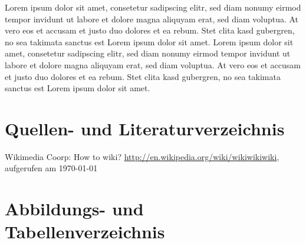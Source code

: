 \documentclass[11pt,a4paper,titlepage,ngerman]{article}
\begin{document}
Lorem ipsum dolor sit amet, consetetur sadipscing elitr, sed diam nonumy eirmod tempor invidunt ut labore et dolore magna aliquyam erat, sed diam voluptua. At vero eos et accusam et justo duo dolores et ea rebum. Stet clita kasd gubergren, no sea takimata sanctus est Lorem ipsum dolor sit amet. Lorem ipsum dolor sit amet, consetetur sadipscing elitr, sed diam nonumy eirmod tempor invidunt ut labore et dolore magna aliquyam erat, sed diam voluptua. At vero eos et accusam et justo duo dolores et ea rebum. Stet clita kasd gubergren, no sea takimata sanctus est Lorem ipsum dolor sit amet.

\newpage

\section{Quellen- und Literaturverzeichnis}

\begin{thebibliography}{999}
 Wikimedia Coorp: \glqq How to wiki?\grqq{} \url{http://en.wikipedia.org/wiki/wikiwikiwiki}, aufgerufen am \today{}
\end{thebibliography}

\section{Abbildungs- und Tabellenverzeichnis}

\renewcommand{\listfigurename}{Verzeichnis der Abbildungen}
\listoffigures

\newpage

\printglossary
\end{document}
